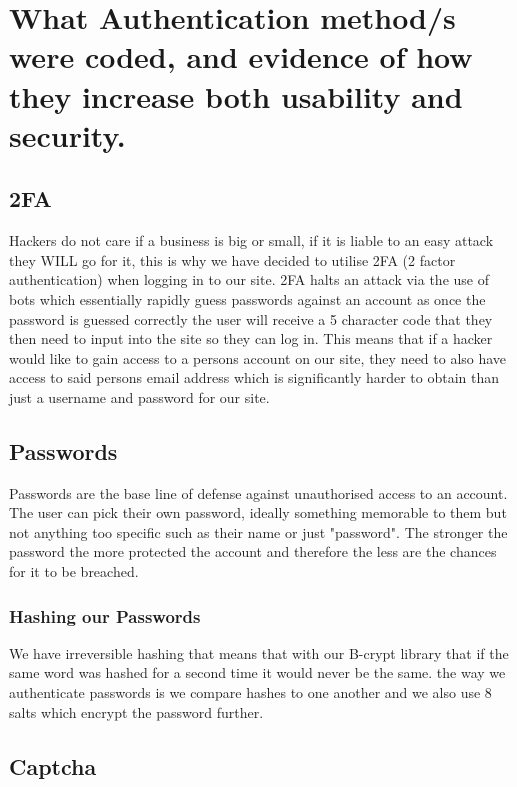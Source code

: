 \documentclass{ueacmpstyle}
\begin{document}
    
    \section{What Authentication method/s were coded, and evidence of how they increase both
    usability and security.}
        
        \subsection{2FA}
        
        Hackers do not care if a business is big or small, if it is liable to an easy attack they WILL go for it, this is why we have decided to utilise 2FA (2 factor authentication) when logging in to our site. 2FA halts an attack via the use of bots which essentially rapidly guess passwords against an account as once the password is guessed correctly the user will receive a 5 character code that they then need to input into the site so they can log in. This means that if a hacker would like to gain access to a persons account on our site, they need to also have access to said persons email address which is significantly harder to obtain than just a username and password for our site.
        
        \subsection{Passwords}
        
        Passwords are the base line of defense against unauthorised access to an account. The user can pick their own password, ideally something memorable to them but not anything too specific such as their name or just "password". The stronger the password the more protected the account and therefore the less are the chances for it to be breached.
        
        \subsubsection{Hashing our Passwords}
        
        We have irreversible hashing that means that with our B-crypt library that if the same word was hashed for a second time it would never be the same. the way we authenticate passwords is we compare hashes to one another and we also use 8 salts which encrypt the password further.
        
        \subsection{Captcha}
        
\end{document}
